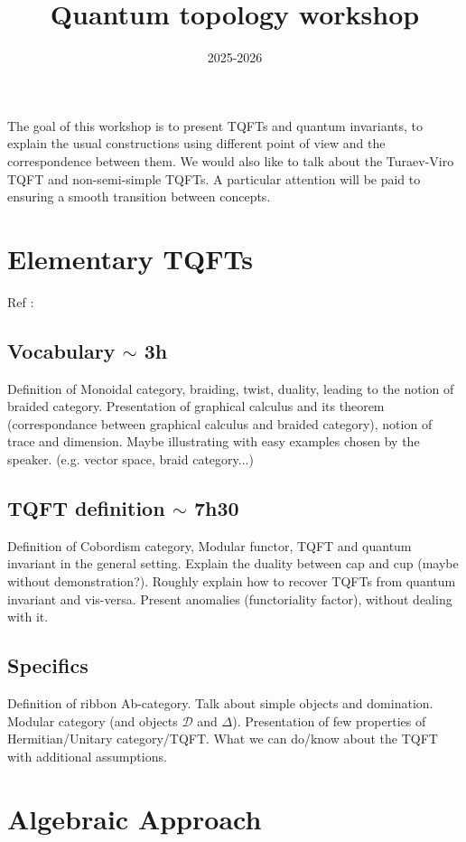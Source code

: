 \documentclass{article}
\title{Quantum topology workshop}
\date{2025-2026}
\begin{document}
\maketitle
\cite{Bul}
The goal of this workshop is to present TQFTs and quantum invariants, to explain the usual constructions using different point of view and the correspondence between them. We would also like to talk about the Turaev-Viro TQFT and non-semi-simple TQFTs. A particular attention will be paid to ensuring a smooth transition between concepts.

\section{Elementary TQFTs} Ref : \cite{Tur}
\subsection{Vocabulary $\sim$ 3h} Definition of Monoidal category, braiding, twist, duality, leading to the notion of braided category. Presentation of graphical calculus and its theorem (correspondance between graphical calculus and braided category), notion of trace and dimension. Maybe illustrating with easy examples chosen by the speaker. (e.g. vector space, braid category...)

\subsection{TQFT definition $\sim$ 7h30} Definition of Cobordism category, Modular functor, TQFT and quantum invariant in the general setting. Explain the duality between cap and cup (maybe without demonstration?). Roughly explain how to recover TQFTs from quantum invariant and vis-versa. Present anomalies (functoriality factor), without dealing with it.

\subsection{Specifics} Definition of ribbon Ab-category. Talk about simple objects and domination. Modular category (and objects $\mathcal{D}$ and $\Delta$). Presentation of few properties of Hermitian/Unitary category/TQFT. What we can do/know about the TQFT with additional assumptions.

\section{Algebraic Approach} 
\end{document}
